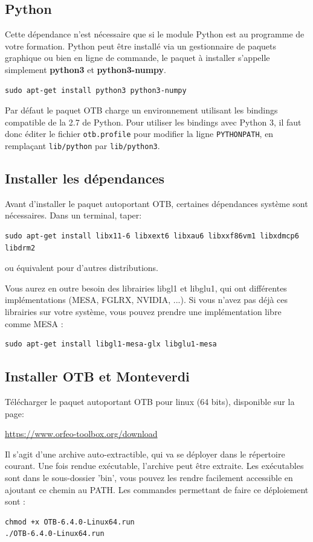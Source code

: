 \documentclass[10pt,a4paper]{article}
\begin{document}
\subsection{Python}
Cette dépendance n'est nécessaire que si le module Python est au programme de votre formation.
Python peut être installé via un gestionnaire de paquets graphique ou bien en
ligne de commande, le paquet à installer s'appelle simplement \textbf{python3} et \textbf{python3-numpy}.
\begin{verbatim}
sudo apt-get install python3 python3-numpy
\end{verbatim}

Par défaut le paquet OTB charge un environnement utilisant les bindings
compatible de la 2.7 de Python. Pour utiliser les bindings avec Python 3, il
faut donc éditer le fichier \verb?otb.profile? pour modifier la ligne
\verb?PYTHONPATH?, en remplaçant \verb?lib/python? par \verb?lib/python3?.

\subsection{Installer les dépendances}
Avant d'installer le paquet autoportant OTB, certaines dépendances système
sont nécessaires. Dans un terminal, taper:
\begin{verbatim}
sudo apt-get install libx11-6 libxext6 libxau6 libxxf86vm1 libxdmcp6 libdrm2
\end{verbatim}
ou équivalent pour d'autres distributions.

Vous aurez en outre besoin des librairies libgl1 et libglu1, qui ont
différentes implémentations (MESA, FGLRX, NVIDIA, ...). Si vous n'avez pas
déjà ces librairies sur votre système, vous pouvez prendre une implémentation
libre comme MESA :
\begin{verbatim}
sudo apt-get install libgl1-mesa-glx libglu1-mesa
\end{verbatim}

\subsection{Installer OTB et Monteverdi}
Télécharger le paquet autoportant OTB pour linux (64 bits), disponible sur la
page:
\begin{center}
\url{https://www.orfeo-toolbox.org/download}
\end{center}

Il s'agit d'une archive auto-extractible, qui va se déployer dans le répertoire
courant. Une fois rendue exécutable, l'archive peut être extraite. Les
exécutables sont dans le sous-dossier 'bin', vous pouvez les rendre facilement
accessible en ajoutant ce chemin au PATH. Les commandes permettant de faire
ce déploiement sont :
\begin{verbatim}
chmod +x OTB-6.4.0-Linux64.run
./OTB-6.4.0-Linux64.run
\end{verbatim}
\end{document}
